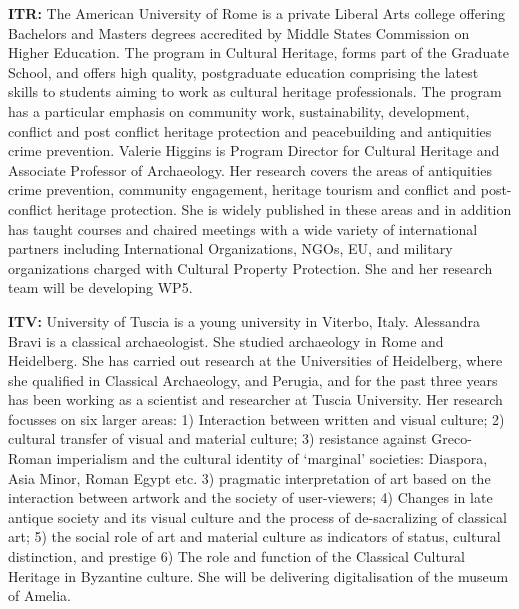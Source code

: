 \item \textbf{ITR:} The American University of Rome is a private Liberal Arts college offering Bachelors and Masters degrees accredited by Middle States Commission on Higher Education. The program in Cultural Heritage, forms part of the Graduate School, and offers high quality, postgraduate education comprising the latest skills to students aiming to work as cultural heritage professionals. The program has a particular emphasis on community work, sustainability, development, conflict and post conflict heritage protection and peacebuilding and antiquities crime prevention. Valerie Higgins is Program Director for Cultural Heritage and Associate Professor of Archaeology. Her research covers the areas of antiquities crime prevention, community engagement, heritage tourism and conflict and post-conflict heritage protection. She is widely published in these areas and in addition has taught courses and chaired meetings with a wide variety of international partners including International Organizations, NGOs, EU, and military organizations charged with Cultural Property Protection. She and her research team will be developing WP5.

\item \textbf{ITV:} University of Tuscia is a young university in Viterbo, Italy. Alessandra Bravi is a classical archaeologist. She studied archaeology in Rome and Heidelberg. She has carried out research at the Universities of Heidelberg, where she qualified in Classical Archaeology, and Perugia, and for the past three years has been working as a scientist and researcher at Tuscia University. Her research focusses on six larger areas: 1) Interaction between written and visual culture; 2) cultural transfer of visual and material culture; 3) resistance against Greco-Roman imperialism and the cultural identity of ‘marginal’ societies: Diaspora, Asia Minor, Roman Egypt etc. 3) pragmatic interpretation of art based on the interaction between artwork and the society of user-viewers; 4) Changes in late antique society and its visual culture and the process of de-sacralizing of classical art; 5) the social role of art and material culture as indicators of status, cultural distinction, and prestige 6) The role and function of the Classical Cultural Heritage in Byzantine culture. She will be delivering digitalisation of the museum of Amelia.

